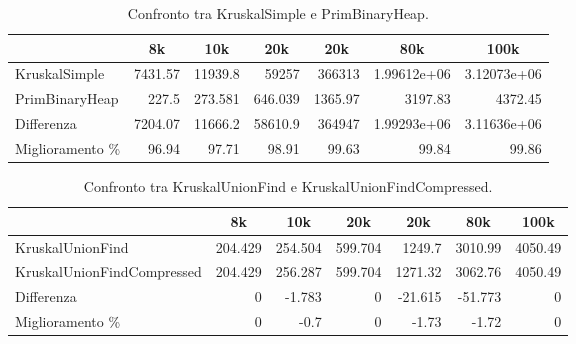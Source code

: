 \begin{table}[h!]
\centering
    \begin{tabular}{|l|rrrrrr|}
    \hline
    &  \multicolumn{1}{c}{8k} & \multicolumn{1}{c}{10k} & \multicolumn{1}{c}{20k} & \multicolumn{1}{c}{20k} & \multicolumn{1}{c}{80k} &           \multicolumn{1}{c|}{100k} \\
    \hline
     KruskalSimple   & 7431.57 & 11939.8   & 59257     & 366313    &    1.99612e+06 &    3.12073e+06 \\
     PrimBinaryHeap &  227.5  &   273.581 &   646.039 &   1365.97 & 3197.83        & 4372.45        \\ \hline
     Differenza     & 7204.07 & 11666.2   & 58610.9   & 364947    &    1.99293e+06 &    3.11636e+06 \\
     Miglioramento \%  &   96.94 &    97.71  &    98.91  &     99.63 &   99.84        &   99.86        \\
    \hline
    \end{tabular}
    \caption{Confronto tra KruskalSimple e PrimBinaryHeap.}
    \label{table:kruskal-simple-vs-prim-binary-heap}
\end{table}

\begin{table}[h!]
\centering
    \hspace*{-0.25cm}
    \begin{tabular}{|l|rrrrrr|}
    \hline
    &  \multicolumn{1}{c}{8k} & \multicolumn{1}{c}{10k} & \multicolumn{1}{c}{20k} & \multicolumn{1}{c}{20k} & \multicolumn{1}{c}{80k} &           \multicolumn{1}{c|}{100k} \\
    \hline
     KruskalUnionFind           & 204.429 & 254.504 & 599.704 & 1249.7   & 3010.99  & 4050.49 \\
     KruskalUnionFindCompressed & 204.429 & 256.287 & 599.704 & 1271.32  & 3062.76  & 4050.49 \\ \hline
     Differenza                 &   0     &  -1.783 &   0     &  -21.615 &  -51.773 &    0    \\
     Miglioramento \%              &   0     &  -0.7   &   0     &   -1.73  &   -1.72  &    0    \\
    \hline
    \end{tabular}
    \caption{Confronto tra KruskalUnionFind e KruskalUnionFindCompressed.}
    \label{table:kruskal-union-find-vs-kruskal-union-find-compressed}
\end{table}

